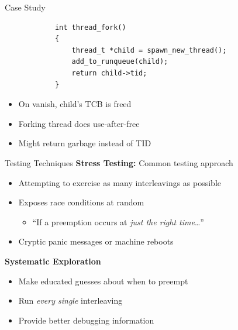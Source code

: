 \documentclass[xcolor=dvipsnames]{beamer}
\begin{document}
\begin{frame}[fragile]{Case Study}
	\begin{center}
	\begin{verbatim}
	        int thread_fork()
	        {
	            thread_t *child = spawn_new_thread();
	            add_to_runqueue(child);
	            return child->tid;
	        }
	\end{verbatim}
	\end{center}

	\begin{itemize}
		\item On vanish, child's TCB is freed
		\item Forking thread does use-after-free
		\item Might return garbage instead of TID
	\end{itemize}
\end{frame}

\begin{frame}{Testing Techniques} %
	\textbf{Stress Testing:} Common testing approach
	\begin{itemize}
		\item Attempting to exercise as many interleavings as possible
		\item Exposes race conditions at random
		\begin{itemize}
			\item ``If a preemption occurs at {\em just the right time}\dots''
		\end{itemize}
		\item Cryptic panic messages or machine reboots
	\end{itemize}
	\linegap

	{\bf Systematic Exploration} %
	\begin{itemize}
		\item Make educated guesses about when to preempt
		\item Run {\em every single} interleaving
		\item Provide better debugging information
	\end{itemize}
\end{frame}
\end{document}
